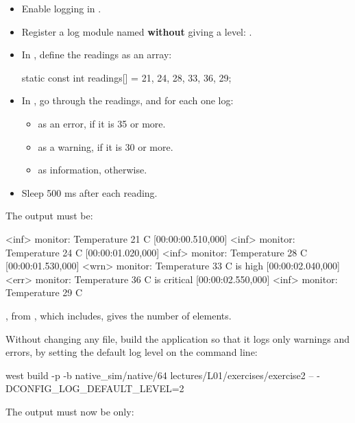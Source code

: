 \begin{itemize}
  \item Enable logging in .
  \item Register a log module named  \textbf{without} giving a level:
    .
  \item In , define the readings as an array:
\begin{ccode}
static const int readings[] = {21, 24, 28, 33, 36, 29};
\end{ccode}
  \item In , go through the readings, and for each one log:
\begin{itemize}
  \item {} as an error, if it is 35 or more.
  \item {} as a warning, if it is 30 or more.
  \item {} as information, otherwise.
\end{itemize}
  \item Sleep 500 ms after each reading.
\end{itemize}

The output must be:

\begin{console}
[00:00:00.000,000] <inf> monitor: Temperature 21 C
[00:00:00.510,000] <inf> monitor: Temperature 24 C
[00:00:01.020,000] <inf> monitor: Temperature 28 C
[00:00:01.530,000] <wrn> monitor: Temperature 33 C is high
[00:00:02.040,000] <err> monitor: Temperature 36 C is critical
[00:00:02.550,000] <inf> monitor: Temperature 29 C
\end{console}

\note[Hint] , from , which
 includes, gives the number of elements.

\label{c1:ex:2.2}

Without changing any file, build the application so that it logs only warnings and errors, by
setting the default log level on the command line:

\begin{shell}
west build -p -b native_sim/native/64 lectures/L01/exercises/exercise2 -- -DCONFIG_LOG_DEFAULT_LEVEL=2
\end{shell}

\noindent The output must now be only:

